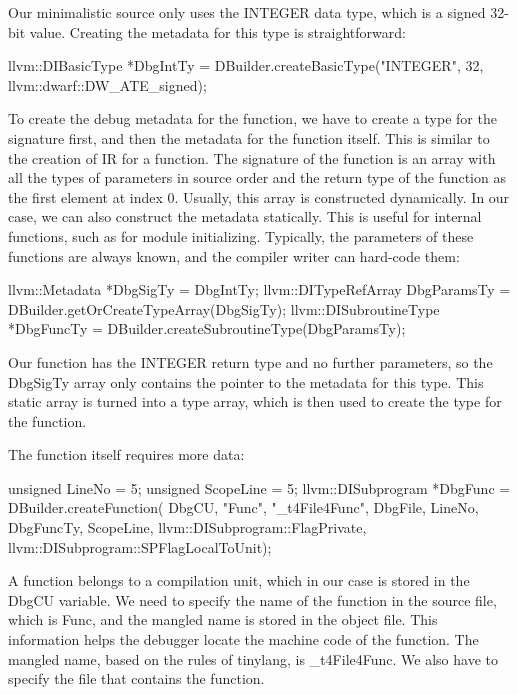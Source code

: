 Our minimalistic source only uses the INTEGER data type, which is a signed 32-bit value. Creating the metadata for this type is straightforward:

\begin{cpp}
llvm::DIBasicType *DbgIntTy =
    DBuilder.createBasicType("INTEGER", 32,
        llvm::dwarf::DW_ATE_signed);
\end{cpp}

To create the debug metadata for the function, we have to create a type for the signature first, and then the metadata for the function itself. This is similar to the creation of IR for a function. The signature of the function is an array with all the types of parameters in source order and the return type of the function as the first element at index 0. Usually, this array is constructed dynamically. In our case, we can also construct the metadata statically. This is useful for internal functions, such as for module initializing. Typically, the parameters of these functions are always known, and the compiler writer can hard-code them:

\begin{cpp}
llvm::Metadata *DbgSigTy = {DbgIntTy};
llvm::DITypeRefArray DbgParamsTy =
            DBuilder.getOrCreateTypeArray(DbgSigTy);
llvm::DISubroutineType *DbgFuncTy =
            DBuilder.createSubroutineType(DbgParamsTy);
\end{cpp}

Our function has the INTEGER return type and no further parameters, so the DbgSigTy array only contains the pointer to the metadata for this type. This static array is turned into a type array, which is then used to create the type for the function.

The function itself requires more data:

\begin{cpp}
unsigned LineNo = 5;
unsigned ScopeLine = 5;
llvm::DISubprogram *DbgFunc = DBuilder.createFunction(
    DbgCU, "Func", "_t4File4Func", DbgFile, LineNo,
    DbgFuncTy, ScopeLine, llvm::DISubprogram::FlagPrivate,
    llvm::DISubprogram::SPFlagLocalToUnit);
\end{cpp}

A function belongs to a compilation unit, which in our case is stored in the DbgCU variable. We need to specify the name of the function in the source file, which is Func, and the mangled name is stored in the object file. This information helps the debugger locate the machine code of the function. The mangled name, based on the rules of tinylang, is \_t4File4Func. We also have to specify the file that contains the function.

